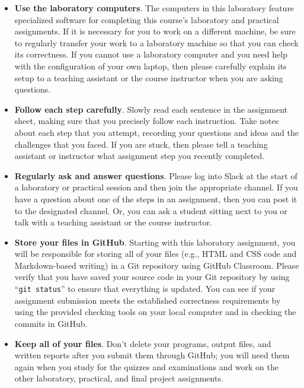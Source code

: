 \documentclass[11pt]{article}
\newcommand{\command}[1]{``\lstinline{#1}''}
\begin{document}
\begin{itemize}
  \setlength{\itemsep}{0pt}

\item {\bf Use the laboratory computers}. The computers in this laboratory feature specialized software for completing
  this course's laboratory and practical assignments. If it is necessary for you to work on a different machine, be sure
  to regularly transfer your work to a laboratory machine so that you can check its correctness. If you cannot use a
  laboratory computer and you need help with the configuration of your own laptop, then please carefully explain its
  setup to a teaching assistant or the course instructor when you are asking questions.

\item {\bf Follow each step carefully}. Slowly read each sentence in the assignment sheet, making sure that you
  precisely follow each instruction. Take notes about each step that you attempt, recording your questions and ideas and
  the challenges that you faced. If you are stuck, then please tell a teaching assistant or instructor what assignment
  step you recently completed.

\item {\bf Regularly ask and answer questions}. Please log into Slack at the start of a laboratory or practical session
  and then join the appropriate channel. If you have a question about one of the steps in an assignment, then you can
  post it to the designated channel. Or, you can ask a student sitting next to you or talk with a teaching assistant or
  the course instructor.

\item {\bf Store your files in GitHub}. Starting with this laboratory assignment, you will be responsible for storing
  all of your files (e.g., HTML and CSS code and Markdown-based writing) in a Git repository using GitHub Classroom.
  Please verify that you have saved your source code in your Git repository by using \command{git status} to ensure that
  everything is updated. You can see if your assignment submission meets the established correctness requirements by
  using the provided checking tools on your local computer and in checking the commits in GitHub.

\item {\bf Keep all of your files}. Don't delete your programs, output files, and written reports after you submit them
  through GitHub; you will need them again when you study for the quizzes and examinations and work on the other
  laboratory, practical, and final project assignments.


\end{itemize}
\end{document}
